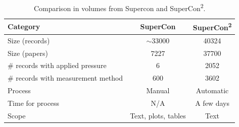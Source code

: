 \begin{table}[htpb]
    \centering\small
    \begin{tabular}{lcc}
        \toprule
        \textbf{Category} & \textbf{SuperCon} & \textbf{SuperCon\textsuperscript{2}} \\
        \midrule
        Size (records) & $\sim$33000 & 40324 \\
        Size (papers) & 7227 & 37700 \\
        \# records with applied pressure & 6 & 2052 \\
        \# records with measurement method & 600 & 3602 \\
        Process & Manual & Automatic \\
        Time for process & N/A & A few days \\
        Scope & Text, plots, tables & Text \\
        \bottomrule
    \end{tabular}
    \caption{Comparison in volumes from Supercon and SuperCon\textsuperscript{2}.}
    \label{tab:comparisong-supercon-supercon2}
\end{table}



